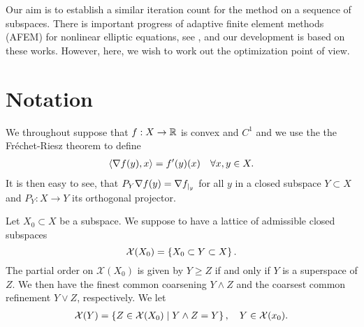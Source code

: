 \documentclass[12pt,english]{article}
\begin{document}
Our aim is to establish a similar iteration count for the method on a sequence of subspaces.
There is important progress of adaptive finite element methods (AFEM) for nonlinear elliptic equations, 
see \cite{ErnVohralik13a,HeidWihler20,HeidPraetoriusWihler21,HaberlPraetoriusSchimanko21,GantnerHaberlPraetorius21,HeidWihler21,HeidStammWihler21,HeidWihler22}, and our development is based on these works. However, here, we wish to 
work out the optimization point of view.
%
\section{Notation}\label{sec:}
%
We throughout suppose that $f:X\to\mathbb R$ is convex and $C^1$ and we use the the Fréchet-Riesz theorem to define
%
\begin{align*}
\langle\nabla f(y),x\rangle = f'(y)(x)\quad \forall x,y\in X.
\end{align*}
%
It is then easy to see, that $P_Y\nabla f(y) = \nabla {f}_{|_{y}}$ for all $y$ in a closed subspace $Y\subset X$ and $P_Y:X\to Y$ its orthogonal projector.


Let $X_0\subset X$ be a subspace. We suppose to have a lattice of admissible closed subspaces 
%
\begin{equation}\label{eq:}
\mathcal X(X_0) = \left\{X_0\subset Y\subset X\right\}.
\end{equation}
%
The partial order on $\mathcal X(X_0)$ is given by $Y\ge Z$ if and only if $Y$ is a superspace of $Z$. We 
then have the finest common coarsening $Y\land Z$ and the coarsest common refinement $Y\lor Z$, respectively.
We let
%
\begin{align*}
\mathcal X(Y) = \left\{Z\in \mathcal X(X_0)\;\middle|\;Y\land Z = Y\right\},\quad Y\in \mathcal X(x_0).
\end{align*}
%
\end{document}
